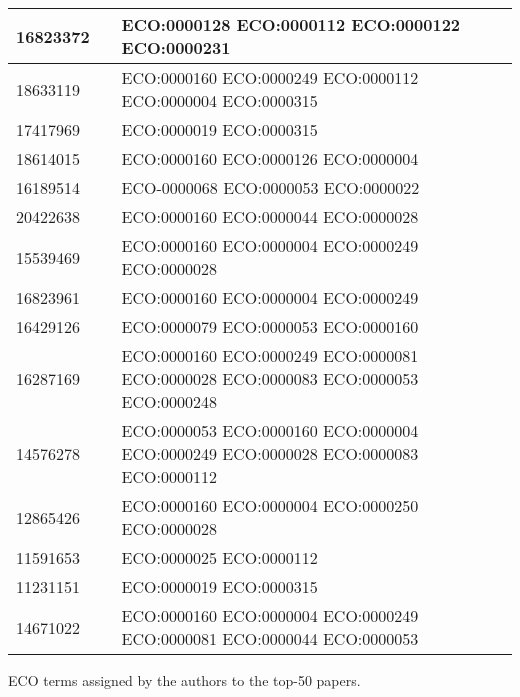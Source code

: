 \begin{longtable}[!ht]{|l|l|p{10cm}|}
16823372 &  \cite{pmid16823372}  & ECO:0000128 ECO:0000112 ECO:0000122 ECO:0000231 \\ \hline
18633119 &  \cite{pmid18633119}  & ECO:0000160 ECO:0000249 ECO:0000112 ECO:0000004 ECO:0000315 \\ \hline
17417969 &  \cite{pmid17417969}  & ECO:0000019 ECO:0000315 \\ \hline
18614015 &  \cite{pmid18614015}  & ECO:0000160 ECO:0000126 ECO:0000004 \\ \hline
16189514 &  \cite{pmid16189514}  & ECO-0000068 ECO:0000053 ECO:0000022 \\ \hline
20422638 &  \cite{pmid20422638}  & ECO:0000160 ECO:0000044 ECO:0000028 \\ \hline
15539469 &  \cite{pmid15539469}  & ECO:0000160 ECO:0000004 ECO:0000249 ECO:0000028 \\ \hline
16823961 &  \cite{pmid16823961}  & ECO:0000160 ECO:0000004 ECO:0000249 \\ \hline
16429126 &  \cite{pmid16429126}  & ECO:0000079 ECO:0000053 ECO:0000160 \\ \hline
16287169 &  \cite{pmid16287169}  & ECO:0000160 ECO:0000249 ECO:0000081 ECO:0000028 ECO:0000083 ECO:0000053 ECO:0000248 \\ \hline
14576278 &  \cite{pmid14576278}  & ECO:0000053 ECO:0000160 ECO:0000004 ECO:0000249 ECO:0000028 ECO:0000083 ECO:0000112 \\ \hline
12865426 &  \cite{pmid12865426}  & ECO:0000160 ECO:0000004 ECO:0000250 ECO:0000028 \\ \hline
11591653 &  \cite{pmid11591653}  & ECO:0000025 ECO:0000112 \\ \hline
11231151 &  \cite{pmid11231151}  & ECO:0000019 ECO:0000315 \\ \hline
14671022 &  \cite{pmid14671022}  & ECO:0000160 ECO:0000004 ECO:0000249 ECO:0000081 ECO:0000044 ECO:0000053 \\ \hline
\end{longtable}
\label{tab:pmid_eco}
\begin{flushleft} ECO terms assigned by the authors to the top-50 papers.
\end{flushleft}

